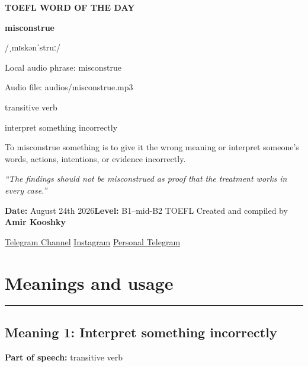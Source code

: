 \documentclass[11pt]{article}
\newcommand{\sectionrule}{\par\vspace{-0.5em}\noindent\textcolor{Accent}{\rule{\linewidth}{0.6pt}}\par}
\begin{document}
\begin{center}
{\sffamily\bfseries\color{Accent} TOEFL WORD OF THE DAY\par}
\vspace{8mm}
{\fontsize{42}{48}\selectfont\bfseries misconstrue\par}
\vspace{2mm}
{\Large\sffamily\color{Accent} /ˌmɪskənˈstruː/\par}
\vspace{2mm}
{\small\sffamily Local audio phrase: misconstrue\par}
{\small\sffamily Audio file: audios/misconstrue.mp3\par}
\vspace{2mm}
{\large\sffamily\color{Muted} transitive verb\par}
\vspace{5mm}
{\sffamily interpret something incorrectly\par}
\vspace{6mm}
{\large To misconstrue something is to give it the wrong meaning or interpret someone's words, actions, intentions, or evidence incorrectly.\par}
\vspace{6mm}
\begin{minipage}{0.84\textwidth}
\itshape “The findings should not be misconstrued as proof that the treatment works in every case.”
\end{minipage}\par
\vspace{10mm}
\textbf{Date:} August 24th 2026\quad\textbullet\quad \textbf{Level:} B1--mid-B2 TOEFL
\vfill
Created and compiled by \textbf{Amir Kooshky}\par
\vspace{2mm}
\href{https://t.me/KooshkyTOEFL}{Telegram Channel}\quad\textbullet\quad
\href{https://www.instagram.com/kooshkytoefl}{Instagram}\quad\textbullet\quad
\href{https://t.me/KooshkyTOEFL\_pv}{Personal Telegram}
\end{center}
\newpage
\tableofcontents
\newpage

\section{Meanings and usage}
\sectionrule
\subsection{Meaning 1: Interpret something incorrectly}
\textbf{Part of speech:} transitive verb
\end{document}
